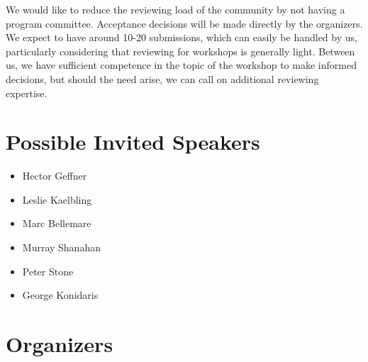 \documentclass[10pt]{article}
\begin{document}
We would like to reduce the reviewing load of the community by not having a
program committee. Acceptance decisions will be made directly by the organizers.
We expect to have around 10-20 submissions, which can easily be handled by us,
particularly considering that reviewing for workshops is generally light.
Between us, we have sufficient competence in the topic of the workshop to make
informed decisions, but should the need arise, we can call on additional
reviewing expertise.

\section*{Possible Invited Speakers}

\begin{itemize}
  \item Hector Geffner
  \item Leslie Kaelbling
  \item Marc Bellemare
  \item Murray Shanahan
  \item Peter Stone
  \item George Konidaris
\end{itemize}


\section*{Organizers}

\end{document}
